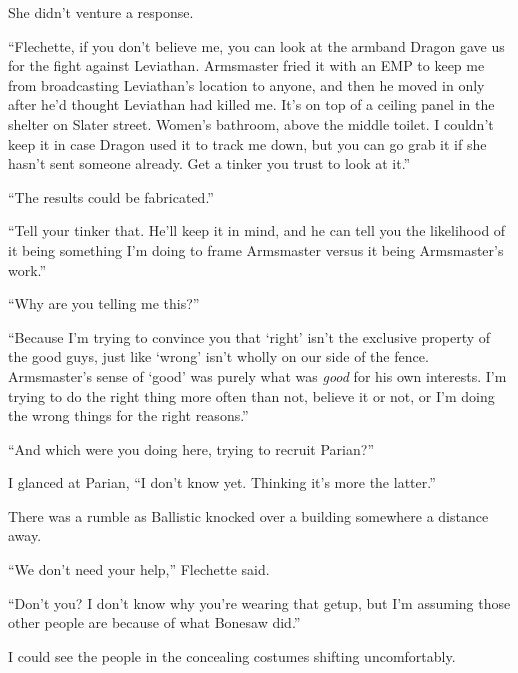 She didn't venture a response.



``Flechette, if you don't believe me, you can look at the armband Dragon gave us for the fight against Leviathan.  Armsmaster fried it with an EMP to keep me from broadcasting Leviathan's location to anyone, and then he moved in only after he'd thought Leviathan had killed me.  It's on top of a ceiling panel in the shelter on Slater street.  Women's bathroom, above the middle toilet.  I couldn't keep it in case Dragon used it to track me down, but you can go grab it if she hasn't sent someone already.  Get a tinker you trust to look at it.''



``The results could be fabricated.''



``Tell your tinker that.  He'll keep it in mind, and he can tell you the likelihood of it being something I'm doing to frame Armsmaster versus it being Armsmaster's work.''



``Why are you telling me this?''



``Because I'm trying to convince you that `right' isn't the exclusive property of the good guys, just like `wrong' isn't wholly on our side of the fence.  Armsmaster's sense of `good' was purely what was \emph{good} for his own interests.  I'm trying to do the right thing more often than not, believe it or not, or I'm doing the wrong things for the right reasons.''



``And which were you doing here, trying to recruit Parian?''



I glanced at Parian, ``I don't know yet.  Thinking it's more the latter.''



There was a rumble as Ballistic knocked over a building somewhere a distance away.



``We don't need your help,'' Flechette said.



``Don't you?  I don't know why you're wearing that getup, but I'm assuming those other people are because of what Bonesaw did.''



I could see the people in the concealing costumes shifting uncomfortably.



